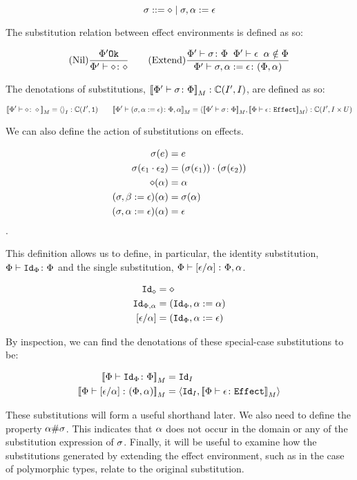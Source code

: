 \documentclass{Report}
\begin{document}
\[
    \sigma ::= \diamond \mid \sigma, \alpha := \epsilon    
\]

The substitution relation between effect environments is defined as so:

\[
    (\text{Nil}) \frac{\Phi' \texttt{Ok}}{\Phi' \vdash \diamond \colon \diamond}
    \quad\quad
    (\text{Extend}) \frac{\Phi' \vdash \sigma \colon \Phi\;\;\Phi'\vdash \epsilon\;\;\alpha\notin\Phi}{\Phi' \vdash \sigma, \alpha :=\epsilon \colon (\Phi, \alpha)}
\]

The denotations of substitutions, ${\bf [\![}\Phi' \vdash \sigma \colon \Phi{\bf ]\!]}_M: \mathbb{C}(I', I)$, are defined as so:

\[
    \deno{\typerelation{\P'}{\nil}{\nil}} = \term{I}: \C(I', \1)
    \quad\quad
    \deno{\typerelation{\P'}{(\si, \a\setto\e)}{\P,\a}} = \pr{\deno{\typerelation{\P'}{\si}{\P}}}{\deno{\typerelation{\P}{\e}{\effect}}}: \C(I', I\times U)
\]

We can also define the action of substitutions on effects.

\begin{align}
    \sigma(e) & = e \\
    \sigma(\epsilon_1\cdot\epsilon_2) & = (\sigma(\epsilon_1))\cdot(\sigma(\epsilon_2))\\
    \diamond(\alpha) & = \alpha\\
    (\sigma, \beta:= \epsilon)(\alpha) & = \sigma(\alpha) \\
    (\sigma, \alpha:= \epsilon)(\alpha) & =\epsilon
\end{align}.

This definition allows us to define, in particular, the identity substitution,$\Phi \vdash \texttt{Id}_{\Phi} \colon \Phi$ and the single substitution, $\Phi \vdash \left[\epsilon / \alpha\right] \colon \Phi,\alpha$.


\begin{align}\label{SpecialSubs}
    \texttt{Id}_{\diamond} & = \diamond\\
    \texttt{Id}_{\Phi,\alpha} & = (\texttt{Id}_{\Phi}, \alpha:=\alpha)\\
    \left[\epsilon / \alpha\right] & = (\texttt{Id}_{\Phi}, \alpha:= \epsilon)
\end{align}

By inspection, we can find the denotations of these special-case substitutions to be:

\begin{align}\label{SpecialSubsDenotations}
    {\bf [\![}\Phi \vdash \texttt{Id}_{\Phi} \colon \Phi{\bf ]\!]}_M & = \texttt{Id}_{I}\\
    {\bf [\![}\Phi \vdash \left[\epsilon / \alpha\right] \colon (\Phi,\alpha){\bf ]\!]}_M & = \left\langle\texttt{Id}_{I}, {\bf [\![}\Phi \vdash \epsilon \colon \texttt{Effect}{\bf ]\!]}_M\right\rangle
\end{align}


These substitutions will form a useful shorthand later. We also need to define the property $\alpha \# \sigma$. This indicates that $\alpha$ does not occur in the domain or any of the substitution expression of $\sigma$. Finally, it will be useful to examine how the substitutions generated by extending the effect environment, such as in the case of polymorphic types, relate to the original substitution.
\end{document}

